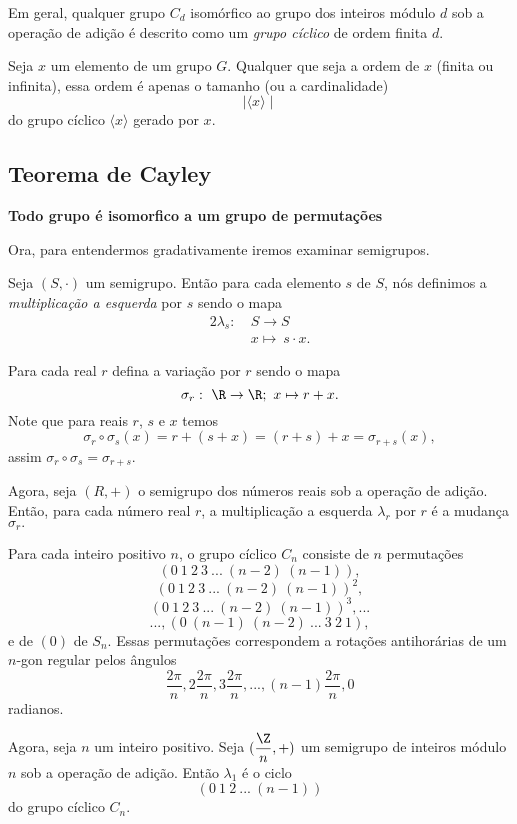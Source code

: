       Em geral, qualquer grupo $C_{d}$ isomórfico ao grupo dos inteiros módulo $d$ sob a operação de adição é descrito como um \emph{grupo cíclico} de ordem finita $d$.
      \begin{stat}
         Seja $x$ um elemento de um grupo $G$. Qualquer que seja a ordem de $x$ (finita ou infinita), essa ordem é apenas o tamanho (ou a cardinalidade) $$\mid \langle x \rangle \mid$$ do grupo cíclico $\langle x \rangle$ gerado por $x$. 
      \end{stat}

   \subsection{Teorema de Cayley}
   \begin{center}
      \Large \color{red} \textbf{Todo grupo é isomorfico a um grupo de permutações}
   \end{center}
   Ora, para entendermos gradativamente iremos examinar semigrupos.

   Seja $(S,\cdot)$ um semigrupo. Então para cada elemento $s$ de $S$, nós definimos a \emph{multiplicação a esquerda} por $s$ sendo o mapa  
   \begin{alignat}{2}
      \lambda_{s}:\ &S \to S\nonumber\\
      &x \mapsto\ s \cdot x. \nonumber
   \end{alignat}

   \begin{exmp}
      Para cada real $r$ defina a variação por $r$ sendo o mapa $$\sigma_{r}:\ \R \to \R;\ x \mapsto r + x.$$
      Note que para reais $r$, $s$ e $x$ temos $$\sigma_{r} \circ \sigma_{s} (x) = r + (s+x) = (r+s) + x = \sigma_{r+s}(x),$$ assim $\sigma_{r} \circ \sigma_{s} = \sigma_{r+s}$.

      Agora, seja $(R,+)$ o semigrupo dos números reais sob a operação de adição. Então, para cada número real $r$, a multiplicação a esquerda $\lambda_{r}$ por $r$ é a mudança $\sigma_{r}.$
   \end{exmp}
   \begin{exmp}
      Para cada inteiro positivo $n$, o grupo cíclico $C_{n}$ consiste de $n$ permutações $$\left(0\ 1\ 2\ 3\ ...\ (n-2)\ (n-1)\right),$$ $$\left(0\ 1\ 2\ 3\ ...\ (n-2)\ (n-1)\right)^{2},$$ $$\left(0\ 1\ 2\ 3\ ...\ (n-2)\ (n-1)\right)^{3}, ...$$ $$... ,\left(0\ (n-1)\ (n-2)\ ...\ 3\ 2\ 1\right),$$ e de $(0)$ de $S_{n}$. Essas permutações correspondem a rotações antihorárias de um $n$-gon regular pelos ângulos
      $$\dfrac{2\pi}{n}, 2\dfrac{2\pi}{n}, 3\dfrac{2\pi}{n}, ... , (n-1)\dfrac{2\pi}{n}, 0$$ radianos.

      Agora, seja $n$ um inteiro positivo. Seja $(\dfrac{\Z}{n}, +)$ um semigrupo de inteiros módulo $n$ sob a operação de adição. Então $\lambda_{1}$ é o ciclo $$(0\ 1\ 2\ ...\ (n-1))$$ do grupo cíclico $C_{n}$.
   \end{exmp}

